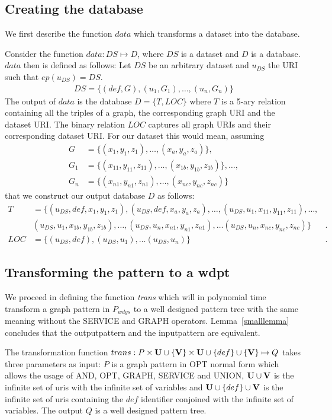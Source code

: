 \subsection{Creating the database}
We first describe the function $data$ which transforms a dataset into the
database.

Consider the function $data: DS \mapsto D$, where $DS$ is a
dataset and $D$ is a database.
$data$ then is defined as follows:
Let $DS$ be an arbitrary dataset and $u_{DS}$ the URI such that $ep(u_{DS}) = DS$.
\begin{align*}
	DS=\{(def,G),(u_1,G_1),\dots,(u_n,G_n)\}
\end{align*}
The output of $data$ is the database $D = \{ T,LOC\}$ where $T$ is a 5-ary relation containing all the triples of a graph, the corresponding graph URI and the dataset URI. The binary relation $LOC$
captures all graph URIs and their corresponding dataset URI. 
For our dataset this would mean, assuming 
\begin{align*}
	G &= \{(x_1,y_1,z_1), \dots, (x_a,y_a,z_a)\},\\ 
	G_1 &= \{(x_{11}, y_{11},z_{11}), \dots, (x_{1b},y_{1b},z_{1b}) \},\dots,\\ 
	G_n &= \{(x_{n1},y_{n1},z_{n1}),\dots,(x_{nc},y_{nc},z_{nc})\}
\end{align*} that we construct our output database $D$ as follows:
\begin{align*}
	T &= \{ (u_{DS},def,x_1,y_1,z_1), (u_{DS},def,x_a,y_a,z_a), \dots, (u_{DS},u_1,x_{11}, y_{11},z_{11}),
	\dots,\\& (u_{DS},u_1,x_{1b},y_{1b},z_{1b} ), \dots,
(u_{DS},u_n,x_{n1},y_{n1},z_{n1}), \dots (u_{DS},u_n,x_{nc},y_{nc},z_{nc})\}&. \\
	LOC &= \{ (u_{DS},def),(u_{DS},u_1),\dots (u_{DS},u_n) \}&.
\end{align*}

\subsection{Transforming the pattern to a wdpt}
We proceed in defining the function \textit{trans} which will in polynomial time 
transform a graph pattern in $P_{wdgs}$ to a well designed pattern tree with the same meaning without the
SERVICE and GRAPH operators. Lemma~\ref{smalllemma} concludes that the outputpattern and the
inputpattern are equivalent.

\bigskip\noindent
The transformation function $trans: P \times \mathbf{U}\cup\{\mathbf{V}\} \times \mathbf{U} \cup \{def \}\cup\{\mathbf{V}\}
\mapsto Q$ takes  three parameters as input: 
$P$ is a graph pattern in OPT normal form which allows the usage of AND, OPT, GRAPH, SERVICE and
UNION, $\mathbf{U}\cup\mathbf{V}$ is the infinite
set of uris with the infinite set of variables and $\mathbf{U}\cup\{def\}\cup \mathbf{V}$ is the infinite set of
uris containing the $def$ identifier conjoined with the infinite set of
variables. The output $Q$ is a well designed pattern tree. 


